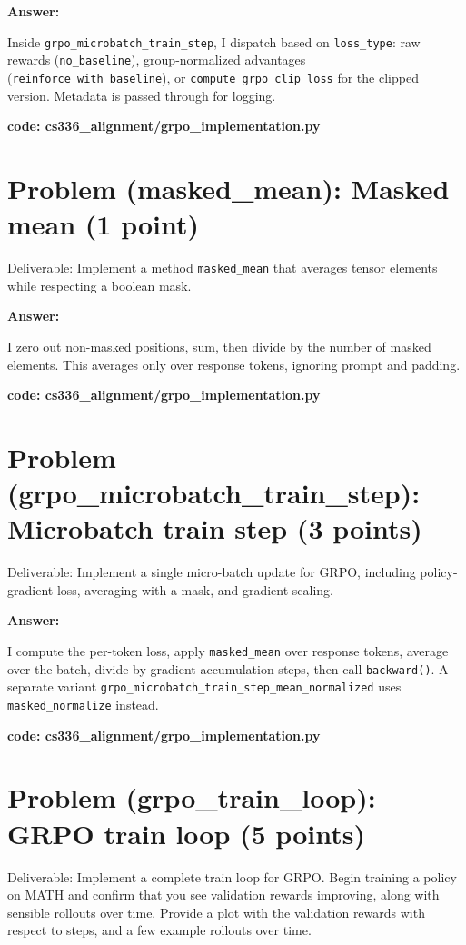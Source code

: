 \documentclass{article}
\begin{document}
\textbf{Answer:}

Inside \texttt{grpo\_microbatch\_train\_step}, I dispatch based on \texttt{loss\_type}: raw rewards (\texttt{no\_baseline}), group-normalized advantages (\texttt{reinforce\_with\_baseline}), or \texttt{compute\_grpo\_clip\_loss} for the clipped version. Metadata is passed through for logging.

\textbf{code: cs336\_alignment/grpo\_implementation.py}


\section*{Problem (masked\_mean): Masked mean (1 point)} %
Deliverable: Implement a method \texttt{masked\_mean} that averages tensor elements while respecting a boolean mask. %

\textbf{Answer:}

I zero out non-masked positions, sum, then divide by the number of masked elements. This averages only over response tokens, ignoring prompt and padding.

\textbf{code: cs336\_alignment/grpo\_implementation.py}


\section*{Problem (grpo\_microbatch\_train\_step): Microbatch train step (3 points)} %
Deliverable: Implement a single micro-batch update for GRPO, including policy-gradient loss, averaging with a mask, and gradient scaling. %

\textbf{Answer:}

I compute the per-token loss, apply \texttt{masked\_mean} over response tokens, average over the batch, divide by gradient accumulation steps, then call \texttt{backward()}. A separate variant \texttt{grpo\_microbatch\_train\_step\_mean\_normalized} uses \texttt{masked\_normalize} instead.

\textbf{code: cs336\_alignment/grpo\_implementation.py}


\section*{Problem (grpo\_train\_loop): GRPO train loop (5 points)} %
Deliverable: Implement a complete train loop for GRPO. Begin training a policy on MATH and confirm that you see validation rewards improving, along with sensible rollouts over time. Provide a plot with the validation rewards with respect to steps, and a few example rollouts over time. %
\end{document}
